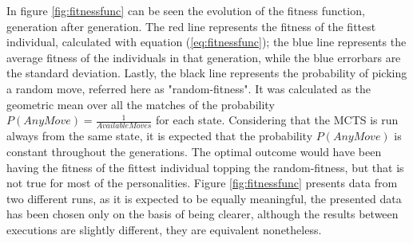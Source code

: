 In figure \ref{fig:fitnessfunc} can be seen the evolution of the fitness function, generation after generation. The red line represents the fitness of the fittest individual, calculated with equation (\ref{eq:fitnessfunc}); the blue line represents the average fitness of the individuals in that generation, while the blue errorbars are the standard deviation. Lastly, the black line represents the probability of picking a random move, referred here as "random-fitness". It was calculated as the geometric mean over all the matches of the probability $P(AnyMove)=\frac{1}{AvailableMoves}$ for each state. Considering that the MCTS is run always from the same state, it is expected that the probability $P(AnyMove)$ is constant throughout the generations. The optimal outcome would have been having the fitness of the fittest individual topping the random-fitness, but that is not true for most of the personalities. Figure \ref{fig:fitnessfunc} presents data from two different runs, as it is expected to be equally meaningful, the presented data has been chosen only on the basis of being clearer, although the results between executions are slightly different, they are equivalent nonetheless. 

